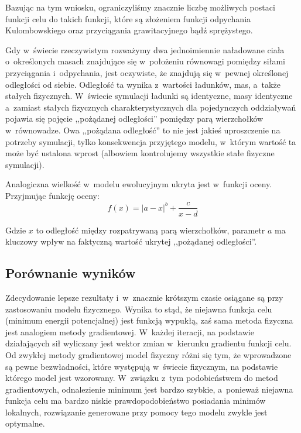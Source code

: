 \documentclass[a4paper,onecolumn,oneside,12pt]{mwart}
\begin{document}
Bazując na tym wniosku, ograniczyliśmy znacznie liczbę możliwych postaci
funkcji celu do takich funkcji, które są złożeniem funkcji odpychania
Kulombowskiego oraz przyciągania grawitacyjnego bądź sprężystego.

Gdy w~świecie rzeczywistym rozważymy dwa jednoimiennie naładowane ciała
o~określonych masach znajdujące się w~położeniu równowagi pomiędzy siłami
przyciągania i~odpychania, jest oczywiste, że znajdują się w~pewnej
określonej odległości od siebie. Odległość ta wynika z~wartości ładunków,
mas, a~także stałych fizycznych. W~świecie symulacji ładunki są identyczne,
masy identyczne a~zamiast stałych fizycznych charakterystycznych dla
pojedynczych oddziaływań pojawia się pojęcie ,,pożądanej odległości''
pomiędzy parą wierzchołków w~równowadze. Owa ,,pożądana odległość'' to nie
jest jakieś uproszczenie na potrzeby symulacji, tylko konsekwencja
przyjętego modelu, w~którym wartość ta może być ustalona wprost (albowiem
kontrolujemy wszystkie stałe fizyczne symulacji).

Analogiczna wielkość w~modelu ewolucyjnym ukryta jest w~funkcji oceny.
Przyjmując funkcję oceny:
\begin{displaymath}
	f(x) = |a - x|^b + \frac{c}{x - d}
\end{displaymath}

Gdzie $x$ to odległość między rozpatrywaną parą wierzchołków, parametr $a$
ma kluczowy wpływ na faktyczną wartość ukrytej ,,pożądanej odległości''.

\subsection{Porównanie wyników}

Zdecydowanie lepsze rezultaty i~w~znacznie krótszym czasie osiągane są przy
zastosowaniu modelu fizycznego. Wynika to stąd, że niejawna funkcja celu
(minimum energii potencjalnej) jest funkcją wypukłą, zaś sama metoda
fizyczna jest analogiem metody gradientowej. W~każdej iteracji, na podstawie
działających sił wyliczany jest wektor zmian w~kierunku gradientu funkcji
celu. Od zwykłej metody gradientowej model fizyczny różni się tym, że
wprowadzone są pewne bezwładności, które występują w~świecie fizycznym, na
podstawie którego model jest wzorowany. W~związku z~tym podobieństwem do
metod gradientowych, odnalezienie minimum jest bardzo szybkie, a~ponieważ
niejawna funkcja celu ma bardzo niskie prawdopodobieństwo posiadania
minimów lokalnych, rozwiązanie generowane przy pomocy tego modelu zwykle
jest optymalne.
\end{document}
